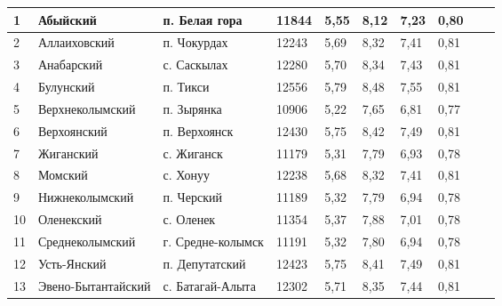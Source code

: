 \begin{landscape}
\begin{center}
\begin{longtable}{|m{5mm}|p{40mm}|p{40mm}|p{30mm}|p{15mm}|p{35mm}|p{35mm}|p{35mm}|p{35mm}|p{35mm}|}
                1   & Абыйский    & п. Белая гора   & 11844   & 5,55    & 8,12    & 7,23    & 0,80 \\ \hline
                2   & Аллаиховский    & п. Чокурдах & 12243   & 5,69    & 8,32    & 7,41    & 0,81 \\ \hline
                3   & Анабарский  & с. Саскылах & 12280   & 5,70    & 8,34    & 7,43    & 0,81 \\ \hline
                4   & Булунский   & п. Тикси    & 12556   & 5,79    & 8,48    & 7,55    & 0,81 \\ \hline
                5   & Верхнеколымский     & п. Зырянка  & 10906   & 5,22    & 7,65    & 6,81    & 0,77 \\ \hline
                6   & Верхоянский     & п. Верхоянск    & 12430   & 5,75    & 8,42    & 7,49    & 0,81 \\ \hline
                7   & Жиганский   & с. Жиганск  & 11179   & 5,31    & 7,79    & 6,93    & 0,78 \\ \hline
                8   & Момский     & с. Хонуу    & 12238   & 5,68    & 8,32    & 7,41    & 0,81 \\ \hline
                9   & Нижнеколымский  & п. Черский  & 11189   & 5,32    & 7,79    & 6,94    & 0,78 \\ \hline
                10  & Оленекский  & с. Оленек   & 11354   & 5,37    & 7,88    & 7,01    & 0,78 \\ \hline
                11  & Среднеколымский     & г. Средне-колымск   & 11191   & 5,32    & 7,80    & 6,94    & 0,78 \\ \hline
                12  & Усть-Янский & п. Депутатский  & 12423   & 5,75    & 8,41    & 7,49    & 0,81 \\ \hline
                13  & Эвено-Бытантайский  & с. Батагай-Алыта    & 12302   & 5,71    & 8,35    & 7,44    & 0,81 \\ 
    
                \hline
            \end{longtable}
        \end{center}
    
    \end{landscape}
